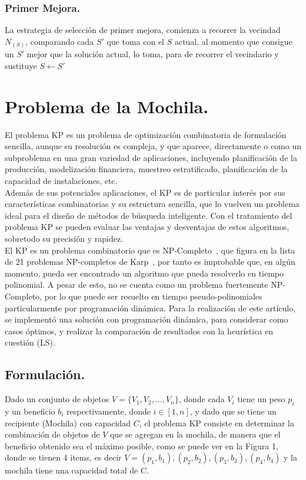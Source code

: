 \documentclass{ci5652}
\begin{document}
		\subsubsection{Primer Mejora.}
			La estrategia de selección de primer mejora, comienza a recorrer la vecindad $N_(S)$, comparando cada $S'$ que toma con el $S$ actual, al momento que consigue un $S'$ mejor que la solución actual, lo toma, para de recorrer el vecindario y sustituye $S \leftarrow S'$	
	
\section{Problema de la Mochila.}
	El problema KP es un problema de optimización combinatoria de formulación sencilla, aunque su resolución es compleja, y que aparece, directamente o como un subproblema en una gran variedad de aplicaciones, incluyendo  planificación de la producción, modelización financiera, muestreo estratificado, planificación de la capacidad de instalaciones, etc.\\
	Además de sus potenciales aplicaciones, el KP es de particular interés por sus características combinatorias y su estructura sencilla, que lo vuelven un problema ideal para el diseño de métodos de búsqueda inteligente. Con el tratamiento del problema KP se pueden evaluar las ventajas y desventajas de estos algoritmos, sobretodo su precisión y rapidez.\\
	El KP es un problema combinatorio que es NP-Completo~\cite{c_KP_01}, que figura en la lista de 21 problemas NP-completos de Karp~\cite{c_KP_04}, por tanto es improbable que, en algún momento, pueda ser encontrado un algoritmo que pueda resolverlo en tiempo polinomial. A pesar de esto, no se cuenta como un problema fuertemente NP-Completo, por lo que puede ser resuelto en tiempo pseudo-polinomiales particularmente por programación dinámica. Para la realización de este artículo, se implementó una solución con programación dinámica, para considerar como casos óptimos, y realizar la comparación de resultados con la heurística en cuestión (LS). 
	
	\subsection{Formulación.}
		Dado un conjunto de objetos $V = \{ V_1,V_2,\ldots,V_n \}$, donde cada $V_i$ tiene un peso $p_i$ y un beneficio $b_i$ respectivamente, donde $i \in [1,n]$, y dado que se tiene un recipiente (Mochila) con capacidad $C$, el problema KP consiste en determinar la combinación de objetos de $V$ que se agregan en la mochila, de manera que el beneficio obtenido sea el máximo posible, como se puede ver en la Figura 1, donde se tienen 4 items, es decir $V = {(p_1,b_1),(p_2,b_2),(p_3,b_3),(p_4,b_4)}$ y la mochila tiene una capacidad total de C.
\end{document}
